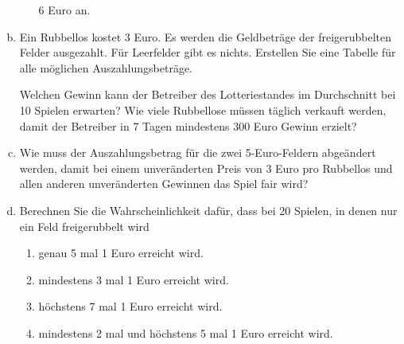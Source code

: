 \begin{exercise}
\begin{enumerate}[a)]
\begin{enumerate}[A:]
                    6 Euro an.
            \end{enumerate}
      \item Ein Rubbellos kostet 3 Euro. Es
            werden die Geldbeträge der
            freigerubbelten Felder ausgezahlt.
            Für Leerfelder gibt es nichts.
            Erstellen Sie eine Tabelle für
            alle möglichen Auszahlungsbeträge.
            \par
            Welchen Gewinn kann der Betreiber
            des Lotteriestandes im Durchschnitt
            bei 10 Spielen erwarten?
            Wie viele Rubbellose müssen täglich
            verkauft werden, damit der Betreiber
            in 7 Tagen mindestens 300 Euro Gewinn
            erzielt?
      \item Wie muss der Auszahlungsbetrag für
            die zwei 5-Euro-Feldern abgeändert
            werden, damit bei einem unveränderten
            Preis von 3 Euro pro Rubbellos und
            allen anderen unveränderten Gewinnen
            das Spiel fair wird?
      \item Berechnen Sie die Wahrscheinlichkeit dafür,
            dass bei 20 Spielen, in denen nur ein Feld
            freigerubbelt wird
            \begin{enumerate}[A:]
              \setlength{\itemsep}{-1ex}%
              \item genau 5 mal 1 Euro erreicht wird.
              \item mindestens 3 mal 1 Euro erreicht wird.
              \item höchstens 7 mal 1 Euro erreicht wird.
              \item mindestens 2 mal und höchstens 5 mal 1 Euro erreicht wird.
            \end{enumerate}
    \end{enumerate}
  \fi
\end{exercise}
